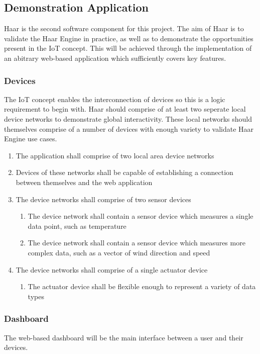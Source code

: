     \subsection{Demonstration Application}
      Haar is the second software component for this project. The aim of Haar is to validate the Haar Engine in practice, as well as to demonstrate the opportunities present in the IoT concept. This will be achieved through the implementation of an abitrary web-based application which sufficiently covers key features.

      \subsubsection{Devices}
        The IoT concept enables the interconnection of devices so this is a logic requirement to begin with. Haar should comprise of at least two seperate local device networks to demonstrate global interactivity. These local networks should themselves comprise of a number of devices with enough variety to validate Haar Engine use cases.

        \begin{enumerate}
          \item The application shall comprise of two local area device networks
          \item Devices of these networks shall be capable of establishing a connection between themselves and the web application
          \item The device networks shall comprise of two sensor devices
          \begin{enumerate}
            \item The device network shall contain a sensor device which measures a single data point, such as temperature
            \item The device network shall contain a sensor device which measures more complex data, such as a vector of wind direction and speed 
          \end{enumerate}
          \item The device networks shall comprise of a single actuator device
          \begin{enumerate}
            \item The actuator device shall be flexible enough to represent a variety of data types
          \end{enumerate} 
        \end{enumerate}

      \subsubsection{Dashboard}
        The web-based dashboard will be the main interface between a user and their devices.

